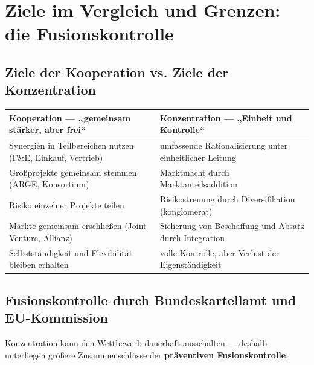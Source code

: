 \documentclass[11pt, a4paper]{article}
\begin{document}
\section{Ziele im Vergleich und Grenzen: die Fusionskontrolle}

\subsection{Ziele der Kooperation vs. Ziele der Konzentration}

\begin{center}
\begin{tabular}{p{6.8cm} p{6.8cm}}
\toprule
\textbf{Kooperation --- „gemeinsam stärker, aber frei``} & \textbf{Konzentration --- „Einheit und Kontrolle``}\\
\midrule
Synergien in Teilbereichen nutzen (F\&E, Einkauf, Vertrieb) & umfassende Rationalisierung unter einheitlicher Leitung\\
Großprojekte gemeinsam stemmen (ARGE, Konsortium) & Marktmacht durch Marktanteilsaddition\\
Risiko einzelner Projekte teilen & Risikostreuung durch Diversifikation (konglomerat)\\
Märkte gemeinsam erschließen (Joint Venture, Allianz) & Sicherung von Beschaffung und Absatz durch Integration\\
Selbstständigkeit und Flexibilität bleiben erhalten & volle Kontrolle, aber Verlust der Eigenständigkeit\\
\bottomrule
\end{tabular}
\end{center}

\subsection{Fusionskontrolle durch Bundeskartellamt und EU-Kommission}

Konzentration kann den Wettbewerb dauerhaft ausschalten --- deshalb unterliegen größere
Zusammenschlüsse der \textbf{präventiven Fusionskontrolle}:
\end{document}
